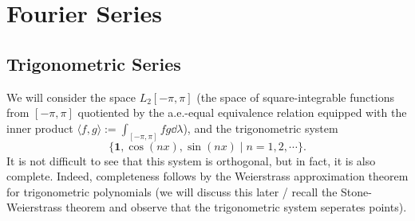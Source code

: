 \documentclass[]{article}
\theoremstyle{definition}
\theoremstyle{definition}
\begin{document}
\newpage
\section{Fourier Series}

\subsection{Trigonometric Series}

We will consider the space \(L_2[-\pi, \pi]\) (the space of square-integrable functions 
from \([-\pi, \pi]\) quotiented by the a.e.-equal equivalence relation equipped with 
the inner product \(\langle f, g\rangle := \int_{[-\pi, \pi]} fg \dd\lambda\)), and the 
trigonometric system 
\[\{\mathbf{1}, \cos(n x), \sin(n x) \mid n = 1, 2, \cdots\}.\]
It is not difficult to see that this system is orthogonal, but in fact, it is 
also complete. Indeed, completeness follows by the Weierstrass approximation theorem 
for trigonometric polynomials (we will discuss this later / recall the Stone-Weierstrass 
theorem and observe that the trigonometric system seperates points).
\end{document}
